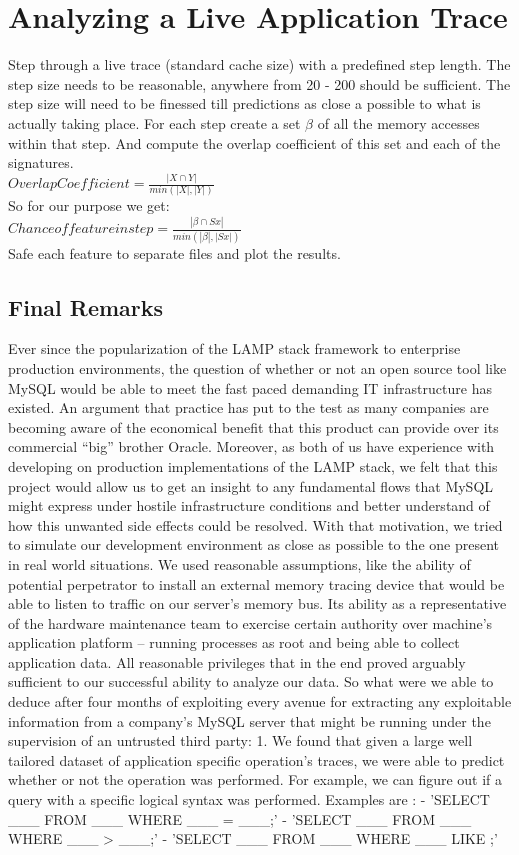 \documentclass[11pt,a4paper, titlepage, oneside]{article}
\begin{document}
\section{Analyzing a Live Application Trace}
Step through a live trace (standard cache size) with a predefined step length. The step size needs to be reasonable, anywhere from 20 - 200 should be sufficient. The step size will need to be finessed till predictions as close a possible to what is actually taking place. For each step create a set $\beta$ of all the memory accesses within that step. And compute the overlap coefficient of this set and each of the signatures. \\
$Overlap Coefficient = \frac{|X\cap Y|}{min(|X|,|Y|)}$ \\
So for our purpose we get: \\
$Chance of feature in step = \frac{|\beta\cap Sx|}{min(|\beta|, |Sx|)}$ \\
Safe each feature to separate files and plot the results.

\subsection{Final Remarks}
Ever since the popularization of the LAMP stack framework to enterprise production environments, the question of whether or not an open source tool like MySQL would be able to meet the fast paced demanding IT infrastructure has existed. An argument that practice has put to the test as many companies are becoming aware of the economical benefit that this product can provide over its commercial “big” brother Oracle. Moreover, as both of us have experience with developing on production implementations of the LAMP stack, we felt that this project would allow us to get an insight to any fundamental flows that MySQL might express under hostile infrastructure conditions and better understand of how this unwanted side effects could be resolved. With that motivation, we tried to simulate our development environment as close as possible to the one present in real world situations. We used reasonable assumptions, like the ability of potential perpetrator to install an external memory tracing device that would be able to listen to traffic on our server's memory bus. Its ability as a representative of the hardware maintenance team to exercise certain authority over machine's application platform – running processes as root and being able to collect application data. All reasonable privileges that in the end proved arguably sufficient to our successful ability to analyze our data.
So what were we able to deduce after four months of exploiting every avenue for extracting any exploitable information from a company's MySQL server that might be running under the supervision of an untrusted third party:
1. We found that given a large well tailored dataset of application specific operation's traces, we were able to predict whether or not the operation was performed. For example, we can figure out if a query with a specific logical syntax was performed. Examples are :
- 'SELECT ___ FROM ___ WHERE ___ = ___;' 
- 'SELECT ___ FROM ___ WHERE ___ > ___;'
- 'SELECT ___ FROM ___ WHERE ___ LIKE ;'
\end{document}
